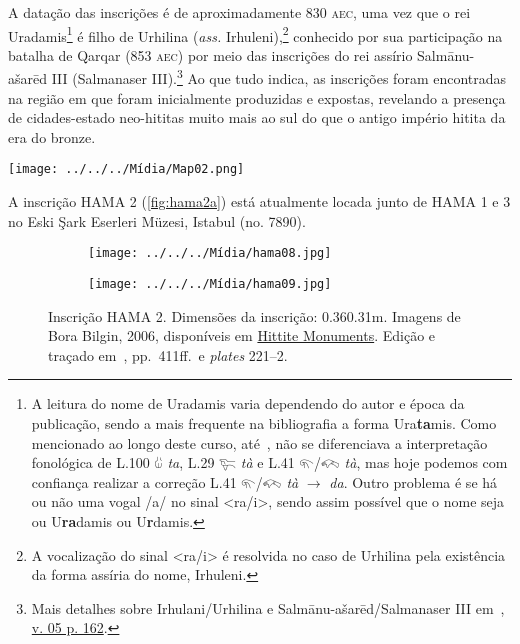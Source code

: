 A datação das inscrições é de aproximadamente 830 \textsc{aec}, uma vez que
o rei
Uradamis\footnote{A leitura do nome de Uradamis varia dependendo do autor e
	época da publicação, sendo a mais frequente na bibliografia a forma
	Ura\textbf{ta}mis.
	Como mencionado ao longo deste curso, até~\citet{Rieken2008}, não se
	diferenciava a interpretação fonológica de
	L.100 𔑰 \emph{ta}, L.29 𔐞 \emph{tà} e L.41 𔐬\slash{}𔐫 \emph{tà}, mas hoje
	podemos com confiança realizar a correção L.41 𔐬\slash{}𔐫 \emph{tà}
	$\rightarrow$ \emph{da}. Outro problema é se há ou não uma vogal /a/ no sinal
	<ra\slash{}i>, sendo assim possível que o nome seja ou U\textbf{ra}damis ou
	U\textbf{r}damis.
} é filho de Urhilina (\emph{ass.} Irhuleni),\footnote{
	A vocalização do sinal <ra\slash{}i> é resolvida no caso de Urhilina pela
	existência da forma assíria do nome, Irhuleni.
} conhecido por sua
participação na batalha de Qarqar (853 \textsc{aec}) por meio das inscrições
do rei assírio Salmānu-ašarēd III (Salmanaser III).\footnote{Mais detalhes
	sobre Irhulani\slash{}Urhilina e Salmānu-ašarēd\slash{}Salmanaser III
	em~,
	\href{https://publikationen.badw.de/en/rla/index\#5833}{v. 05 p. 162}.
}
Ao que tudo indica, as inscrições foram encontradas na região em que foram
inicialmente produzidas e expostas, revelando a presença de cidades-estado
neo-hititas muito mais ao sul do que o antigo império hitita da era do bronze.

\begin{flushright}
	\texttt{[image: ../../../Mídia/Map02.png]}
\end{flushright}

A inscrição HAMA 2 (\autoref{fig:hama2a}) está atualmente locada junto de HAMA
1 e 3 no Eski Şark Eserleri Müzesi, Istabul (no. 7890).

\begin{figure}[h]
	\centering
	\begin{subfigure}{0.49\textwidth}
		\texttt{[image: ../../../Mídia/hama08.jpg]}
	\end{subfigure}
	\begin{subfigure}{0.49\textwidth}
		\texttt{[image: ../../../Mídia/hama09.jpg]}
	\end{subfigure}
	\caption[Inscrição HAMA 2]{Inscrição HAMA 2. Dimensões da inscrição:
		0.36\times0.31m.
		Imagens de Bora Bilgin, 2006,
		disponíveis em
		\href{https://www.hittitemonuments.com/hama/}{Hittite Monuments}.
		Edição e traçado em~, pp.\ 411ff.\ e \emph{plates}
		221--2.
	}\label{fig:hama2a}
\end{figure}

